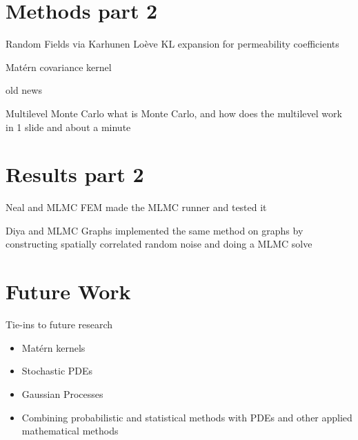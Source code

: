 \documentclass[aspectratio=169,11pt]{beamer}
\begin{document}
\section{Methods part 2}
\begin{frame}{Random Fields via Karhunen Lo\`{e}ve}
  KL expansion for permeability coefficients

  Mat\'{e}rn covariance kernel

  old news
\end{frame}

\begin{frame}{Multilevel Monte Carlo}
  what is Monte Carlo, and how does the multilevel work in 1 slide and about a minute
\end{frame}

\section{Results part 2}
\begin{frame}{Neal and MLMC FEM}
  made the MLMC runner and tested it
\end{frame}

\begin{frame}{Diya and MLMC Graphs}
  implemented the same method on graphs by constructing spatially correlated random noise and doing a MLMC solve
\end{frame}

\section{Future Work}
\begin{frame}{Tie-ins to future research}
  \begin{itemize}
    \item Mat\'{e}rn kernels
    \item Stochastic PDEs
    \item Gaussian Processes
    \item Combining probabilistic and statistical methods with PDEs and other applied mathematical methods
  \end{itemize}
\end{frame}
\end{document}
